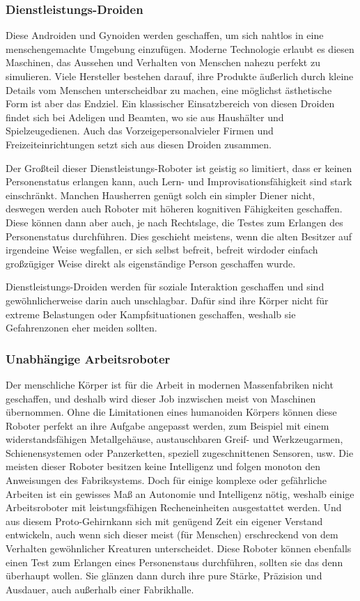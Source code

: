 \subsubsection{Dienstleistungs-Droiden}
Diese Androiden und Gynoiden werden geschaffen, um sich nahtlos in eine menschengemachte Umgebung einzufügen. Moderne Technologie erlaubt es diesen Maschinen, das Aussehen und Verhalten von Menschen nahezu perfekt zu simulieren. Viele Hersteller bestehen darauf, ihre Produkte äußerlich durch kleine Details vom Menschen unterscheidbar zu machen, eine möglichst ästhetische Form ist aber das Endziel. Ein klassischer Einsatzbereich von diesen Droiden findet sich bei Adeligen und Beamten, wo sie aus Haushälter und \glqq Spielzeuge\grqq  dienen. Auch das \glqq Vorzeigepersonal\grqq  vieler Firmen und Freizeiteinrichtungen setzt sich aus diesen Droiden zusammen.

Der Großteil dieser Dienstleistungs-Roboter ist geistig so limitiert, dass er keinen Personenstatus erlangen kann, auch Lern- und Improvisationsfähigkeit sind stark einschränkt. Manchen Hausherren genügt solch ein simpler Diener nicht, deswegen werden auch Roboter mit höheren kognitiven Fähigkeiten geschaffen. Diese können dann aber auch, je nach Rechtslage, die Testes zum Erlangen des Personenstatus durchführen. Dies geschieht meistens, wenn die alten Besitzer auf irgendeine Weise wegfallen, er sich selbst \glqq befreit\grqq , \glqq befreit wird\grqq  oder einfach großzügiger Weise direkt als eigenständige Person geschaffen wurde.

Dienstleistungs-Droiden werden für soziale Interaktion geschaffen und sind gewöhnlicherweise darin auch unschlagbar. Dafür sind ihre Körper nicht für extreme Belastungen oder Kampfsituationen geschaffen, weshalb sie Gefahrenzonen eher meiden sollten.
\subsubsection{Unabhängige Arbeitsroboter}
Der menschliche Körper ist für die Arbeit in modernen Massenfabriken nicht geschaffen, und deshalb wird dieser Job inzwischen meist von Maschinen übernommen. Ohne die Limitationen eines humanoiden Körpers können diese Roboter perfekt an ihre Aufgabe angepasst werden, zum Beispiel mit einem widerstandsfähigen Metallgehäuse, austauschbaren Greif- und Werkzeugarmen, Schienensystemen oder Panzerketten, speziell zugeschnittenen Sensoren, usw. Die meisten dieser Roboter besitzen keine Intelligenz und folgen monoton den Anweisungen des Fabriksystems. Doch für einige komplexe oder gefährliche Arbeiten ist ein gewisses Maß an Autonomie und Intelligenz nötig, weshalb einige Arbeitsroboter mit leistungsfähigen Recheneinheiten ausgestattet werden. Und aus diesem \glqq Proto-Gehirn\grqq kann sich mit genügend Zeit ein eigener Verstand entwickeln, auch wenn sich dieser meist (für Menschen) erschreckend von dem Verhalten gewöhnlicher Kreaturen unterscheidet. Diese Roboter können ebenfalls einen Test zum Erlangen eines Personenstaus durchführen, sollten sie das denn überhaupt wollen. Sie glänzen dann durch ihre pure Stärke, Präzision und Ausdauer, auch außerhalb einer Fabrikhalle.
